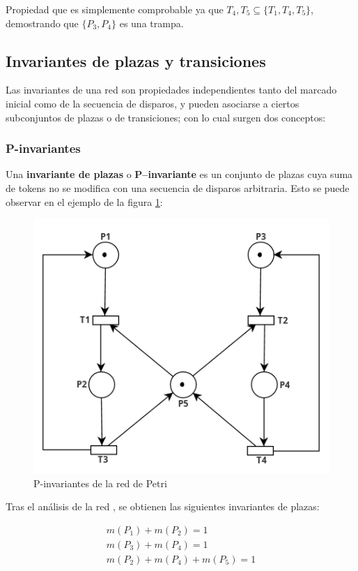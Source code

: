Propiedad que es simplemente comprobable ya que ${T_4 , T_5} \subseteq \{T_1 , T_4 , T_5 \}$, demostrando que $\{P_3 , P_4\}$ es una trampa.

\subsection{Invariantes de plazas y transiciones}
Las invariantes de una red son propiedades independientes tanto del marcado inicial como de la secuencia de disparos, y pueden asociarse a ciertos subconjuntos de plazas o de transiciones; con lo cual surgen dos conceptos:

\subsubsection{P-invariantes}
Una \textbf{invariante de plazas} o \textbf{P–invariante} es un conjunto de plazas cuya suma de tokens no se modifica con una secuencia de disparos arbitraria. 
Esto se puede observar en el ejemplo de la figura \ref{fig:rdp_p_invariantes}:

\begin{figure}[H]
    \centering
    \includegraphics[width=0.7\linewidth]{images/rdp_p_invariantes.png}
    \caption{P-invariantes de la red de Petri}
    \label{fig:rdp_p_invariantes}
\end{figure}

\noindent Tras el análisis de la red , se obtienen las siguientes invariantes de plazas:
 
\begin{equation}
   \begin{array}{cc}
       m(P_1) + m(P_2) = 1  \\
       m(P_3) + m(P_4) = 1   \\
       m(P_2) + m(P_4) + m(P_5) = 1 
   \end{array}
\end{equation}


